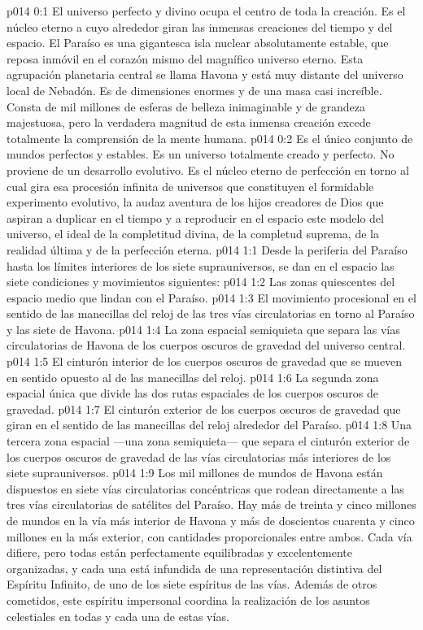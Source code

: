 \author{Perfeccionador de la sabiduría}
\vs p014 0:1 El universo perfecto y divino ocupa el centro de toda la creación. Es el núcleo eterno a cuyo alrededor giran las inmensas creaciones del tiempo y del espacio. El Paraíso es una gigantesca isla nuclear absolutamente estable, que reposa inmóvil en el corazón mismo del magnífico universo eterno. Esta agrupación planetaria central se llama Havona y está muy distante del universo local de Nebadón. Es de dimensiones enormes y de una masa casi increíble. Consta de mil millones de esferas de belleza inimaginable y de grandeza majestuosa, pero la verdadera magnitud de esta inmensa creación excede totalmente la comprensión de la mente humana.
\vs p014 0:2 Es el único conjunto de mundos perfectos y estables. Es un universo totalmente creado y perfecto. No proviene de un desarrollo evolutivo. Es el núcleo eterno de perfección en torno al cual gira esa procesión infinita de universos que constituyen el formidable experimento evolutivo, la audaz aventura de los hijos creadores de Dios que aspiran a duplicar en el tiempo y a reproducir en el espacio este modelo del universo, el ideal de la completitud divina, de la completud suprema, de la realidad última y de la perfección eterna.
\vs p014 1:1 Desde la periferia del Paraíso hasta los límites interiores de los siete suprauniversos, se dan en el espacio las siete condiciones y movimientos siguientes:
\vs p014 1:2 Las zonas quiescentes del espacio medio que lindan con el Paraíso.
\vs p014 1:3 El movimiento procesional en el sentido de las manecillas del reloj de las tres vías circulatorias en torno al Paraíso y las siete de Havona.
\vs p014 1:4 La zona espacial semiquieta que separa las vías circulatorias de Havona de los cuerpos oscuros de gravedad del universo central.
\vs p014 1:5 El cinturón interior de los cuerpos oscuros de gravedad que se mueven en sentido opuesto al de las manecillas del reloj.
\vs p014 1:6 La segunda zona espacial única que divide las dos rutas espaciales de los cuerpos oscuros de gravedad.
\vs p014 1:7 El cinturón exterior de los cuerpos oscuros de gravedad que giran en el sentido de las manecillas del reloj alrededor del Paraíso.
\vs p014 1:8 Una tercera zona espacial ---una zona semiquieta--- que separa el cinturón exterior de los cuerpos oscuros de gravedad de las vías circulatorias más interiores de los siete suprauniversos.
\vs p014 1:9 \pc Los mil millones de mundos de Havona están dispuestos en siete vías circulatorias concéntricas que rodean directamente a las tres vías circulatorias de satélites del Paraíso. Hay más de treinta y cinco millones de mundos en la vía más interior de Havona y más de doscientos cuarenta y cinco millones en la más exterior, con cantidades proporcionales entre ambos. Cada vía difiere, pero todas están perfectamente equilibradas y excelentemente organizadas, y cada una está infundida de una representación distintiva del Espíritu Infinito, de uno de los siete espíritus de las vías. Además de otros cometidos, este espíritu impersonal coordina la realización de los asuntos celestiales en todas y cada una de estas vías.
